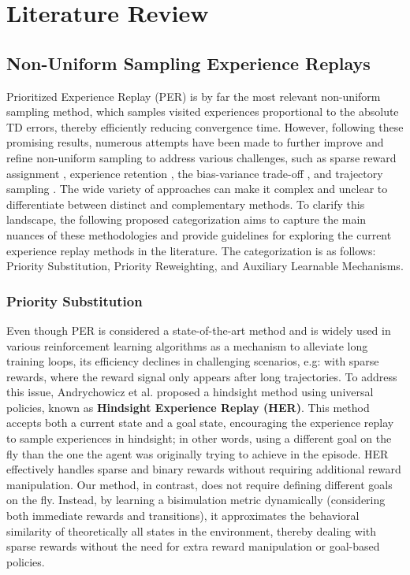 
\chapter{Literature Review}

\section{Non-Uniform Sampling Experience Replays}

Prioritized Experience Replay (PER) \cite{schaul2015prioritized} is by far the most relevant non-uniform sampling method, which samples visited experiences proportional to the absolute TD errors, thereby efficiently reducing convergence time. However, following these promising results, numerous attempts have been made to further improve and refine non-uniform sampling to address various challenges, such as sparse reward assignment \cite{andrychowicz2017hindsight, dai2021diversity}, experience retention \cite{de2018experience}, the bias-variance trade-off \cite{fedus2020revisiting, hessel2018rainbow, sutton1988learning, sutton2018reinforcement}, and trajectory sampling \cite{dai2021diversity, liu2023prioritized}. The wide variety of approaches can make it complex and unclear to differentiate between distinct and complementary methods. To clarify this landscape, the following proposed categorization aims to capture the main nuances of these methodologies and provide guidelines for exploring the current experience replay methods in the literature. The categorization is as follows: Priority Substitution, Priority Reweighting, and Auxiliary Learnable Mechanisms.

\subsection{Priority Substitution}

 Even though PER is considered a state-of-the-art method and is widely used in various reinforcement learning algorithms as a mechanism to alleviate long training loops, its efficiency declines in challenging scenarios, e.g: with sparse rewards, where the reward signal only appears after long trajectories. To address this issue, Andrychowicz et al. \cite{andrychowicz2017hindsight} proposed a hindsight method using universal policies, known as \textbf{Hindsight Experience Replay (HER)}. This method accepts both a current state and a goal state, encouraging the experience replay to sample experiences in hindsight; in other words, using a different goal on the fly than the one the agent was originally trying to achieve in the episode. HER effectively handles sparse and binary rewards without requiring additional reward manipulation. Our method, in contrast, does not require defining different goals on the fly. Instead, by learning a bisimulation metric dynamically (considering both immediate rewards and transitions), it approximates the behavioral similarity of theoretically all states in the environment, thereby dealing with sparse rewards without the need for extra reward manipulation or goal-based policies.

